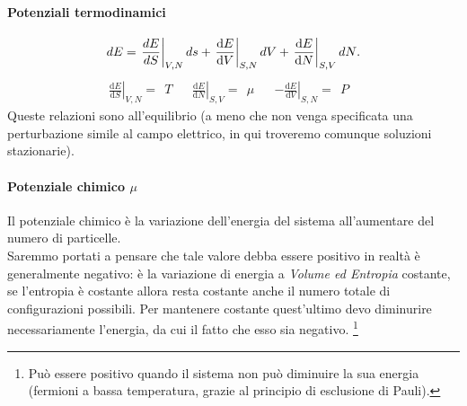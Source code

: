 \paragraph{Potenziali termodinamici}%
\[
	dE = \left.\frac{dE}{dS}\right|_{V,N}ds + \left.\frac{\mbox{d} E}{\mbox{d} V} \right|_{S,N}dV + \left.\frac{\mbox{d} E}{\mbox{d} N} \right|_{S,V}dN\\
.\]
\begin{align}
	\left.\frac{\mbox{d} E}{\mbox{d} S}\right|_{V,N}= \ \ T&
	&\left.\frac{\mbox{d} E}{\mbox{d} N}\right|_{S,V} = \ \ \mu& 
	&\left.-\frac{\mbox{d} E}{\mbox{d} V} \right|_{S,N} = \ \ P&
\end{align}
Queste relazioni sono all'equilibrio (a meno che non venga specificata una perturbazione simile al campo elettrico, in qui troveremo comunque soluzioni stazionarie).
\paragraph{Potenziale chimico $\mu$}%
Il potenziale chimico è la variazione dell'energia del sistema all'aumentare del numero di particelle.\\
Saremmo portati a pensare che tale valore debba essere positivo in realtà è generalmente negativo: è la variazione di energia a \textit{Volume ed Entropia} costante, se l'entropia è costante allora resta costante anche il numero totale di configurazioni possibili. Per mantenere costante quest'ultimo devo diminurire necessariamente l'energia, da cui il fatto che esso sia negativo.
\footnote{Può essere positivo quando il sistema non può diminuire la sua energia (fermioni a bassa temperatura, grazie al principio di esclusione di Pauli).}
